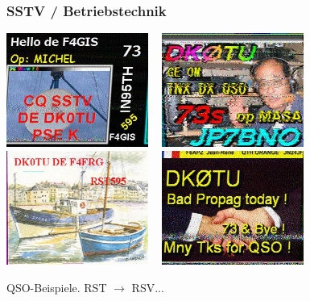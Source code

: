 \begin{frame}
    \frametitle{SSTV / Betriebstechnik}

    \begin{center}
        \includegraphics[width=0.35\textwidth,height=.35\textheight,keepaspectratio]{e16/sstv_qso_201306141504-F4GIS.jpg}
        ~
        \includegraphics[width=0.35\textwidth,height=.35\textheight,keepaspectratio]{e16/sstv_qso_201306141947-JP7BNO.jpg}
        \\[1em]
        \includegraphics[width=0.35\textwidth,height=.35\textheight,keepaspectratio]{e16/sstv_qso_201307141440-F4FRG.jpg}
        ~
        \includegraphics[width=0.35\textwidth,height=.35\textheight,keepaspectratio]{e16/sstv_qso_201307151417-F6APZ.jpg}
    \end{center}

    \centering QSO-Beispiele. RST $\rightarrow$ RSV...

\end{frame}

